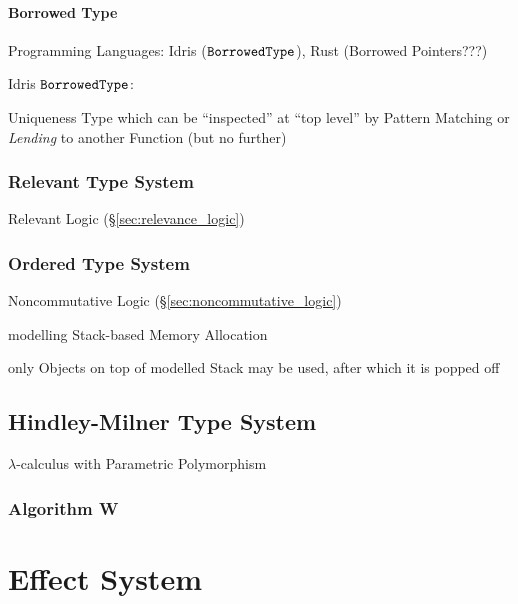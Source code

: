 \paragraph{Borrowed Type}\label{sec:borrowed_type}\hfill

Programming Languages: Idris ($\mathtt{BorrowedType}$), Rust (Borrowed
Pointers???)

Idris $\mathtt{BorrowedType}$:

Uniqueness Type which can be ``inspected'' at ``top level'' by Pattern
Matching or \emph{Lending} to another Function (but no further)



\subsubsection{Relevant Type System}\label{sec:relevant_type}

Relevant Logic (\S\ref{sec:relevance_logic})



\subsubsection{Ordered Type System}\label{sec:ordered_type}

Noncommutative Logic (\S\ref{sec:noncommutative_logic})

modelling Stack-based Memory Allocation

only Objects on top of modelled Stack may be used, after which it is
popped off



\subsection{Hindley-Milner Type System}\label{sec:hindley_milner}

$\lambda$-calculus with Parametric Polymorphism



\subsubsection{Algorithm W}\label{sec:algorithm_w}



\section{Effect System}\label{sec:effect_system}

